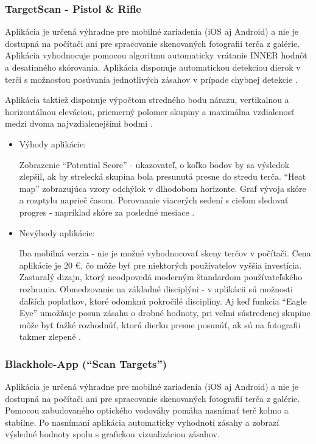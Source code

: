 \subsubsection{TargetScan - Pistol \& Rifle}
Aplikácia je určená výhradne pre mobilné zariadenia (iOS aj Android) a nie je dostupná na počítači ani pre spracovanie skenovaných 
fotografií terča z galérie. Aplikácia vyhodnocuje pomocou algoritmu automaticky vrátanie INNER hodnôt a desatinného skórovania. Aplikácia
disponuje automatickou detekciou dierok v terči s možnosťou posúvania jednotlivých zásahov v prípade chybnej detekcie \cite{TargetScanApp}.

Aplikácia taktiež disponuje výpočtom stredného bodu nárazu, vertikalnou a horizontálnou eleváciou, priemerný polomer skupiny a 
maximálna vzdialenosť medzi dvoma najvzdialenejšími bodmi \cite{TargetScanApp}.

\begin{itemize}
  \item Výhody aplikácie:
  
  Zobrazenie ``Potential Score'' - ukazovateľ, o koľko bodov by sa výsledok zlepšil, ak by strelecká skupina bola presunutá presne 
  do stredu terča.
  ``Heat map'' zobrazujúca vzory odchýlok v dlhodobom horizonte.
  Graf vývoja skóre a rozptylu naprieč časom.
  Porovnanie viacerých sedení s cieľom sledovať progres - napríklad skóre za posledné mesiace \cite{TargetScanApp}.

  \item Nevýhody aplikácie:

  Iba mobilná verzia - nie je možné vyhodnocovať skeny terčov v počítači.
  Cena aplikácie je 20 €, čo môže byť pre niektorých používateľov vyššia investícia.
  Zastaralý dizajn, ktorý neodpovedá moderným štandardom používateľského rozhrania.
  Obmedzovanie na základné disciplýni - v aplikácii sú možnosti ďaľších poplatkov, ktoré odomknú pokročilé disciplíny.
  Aj keď funkcia ``Eagle Eye'' umožňuje posun zásahu o drobné hodnoty, pri veľmi sústredenej skupine môže byť ťažké rozhodnúť, 
  ktorú dierku presne posunúť, ak sú na fotografii takmer zlepené \cite{TargetScanApp}.
\end{itemize}

\subsubsection{Blackhole-App (``Scan Targets'')}
Aplikácia je určená výhradne pre mobilné zariadenia (iOS aj Android) a nie je dostupná na počítači ani pre spracovanie skenovaných 
fotografií terča z galérie. Pomocou zabudovaného optického vodováhy pomáha nasnímať terč kolmo a stabilne. Po nasnímaní aplikácia 
automaticky vyhodnotí zásahy a zobrazí výsledné hodnoty spolu s grafickou vizualizáciou zásahov. 

